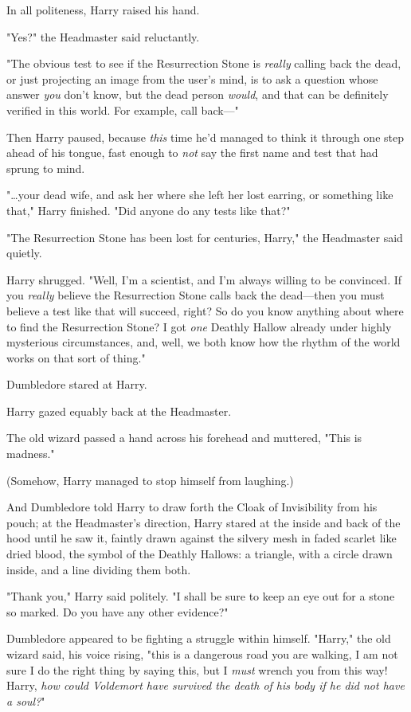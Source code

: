 In all politeness, Harry raised his hand.

"Yes?" the Headmaster said reluctantly.

"The obvious test to see if the Resurrection Stone is \emph{really} calling
back the dead, or just projecting an image from the user's mind, is to ask a
question whose answer \emph{you} don't know, but the dead person \emph{would},
and that can be definitely verified in this world. For example, call back---"

Then Harry paused, because \emph{this} time he'd managed to think it through
one step ahead of his tongue, fast enough to \emph{not} say the first name and
test that had sprung to mind.

"{\ldots}your dead wife, and ask her where she left her lost earring, or
something like that," Harry finished. "Did anyone do any tests like that?"

"The Resurrection Stone has been lost for centuries, Harry," the Headmaster
said quietly.

Harry shrugged. "Well, I'm a scientist, and I'm always willing to be convinced.
If you \emph{really} believe the Resurrection Stone calls back the dead---then
you must believe a test like that will succeed, right? So do you know anything
about where to find the Resurrection Stone? I got \emph{one} Deathly Hallow
already under highly mysterious circumstances, and, well, we both know how the
rhythm of the world works on that sort of thing."

Dumbledore stared at Harry.

Harry gazed equably back at the Headmaster.

The old wizard passed a hand across his forehead and muttered, "This is
madness."

(Somehow, Harry managed to stop himself from laughing.)

And Dumbledore told Harry to draw forth the Cloak of Invisibility from his
pouch; at the Headmaster's direction, Harry stared at the inside and back of
the hood until he saw it, faintly drawn against the silvery mesh in faded
scarlet like dried blood, the symbol of the Deathly Hallows: a triangle, with a
circle drawn inside, and a line dividing them both.

"Thank you," Harry said politely. "I shall be sure to keep an eye out for a
stone so marked. Do you have any other evidence?"

Dumbledore appeared to be fighting a struggle within himself. "Harry," the old
wizard said, his voice rising, "this is a dangerous road you are walking, I am
not sure I do the right thing by saying this, but I \emph{must} wrench you from
this way! Harry, \emph{how could Voldemort have survived the death of his body
if he did not have a soul?}"

